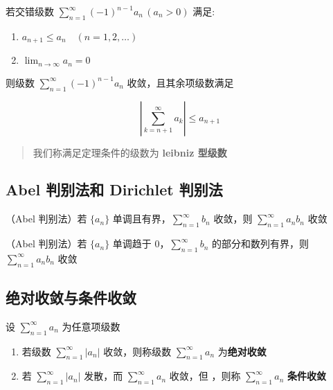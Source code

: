 \documentclass[lang = zh , final , oneside , openany , titlepage , zihao = -4 , linespread = 1.3 , baselineskip = false , cjk-font = windows , text-font = newtx , math-font = newtx]{sjtureport}
\begin{document}
\begin{definition}
    若交错级数
\(\displaystyle \sum_{n=1}^\infty (-1)^{n-1}a_n \,\left(a_n>0\right)\)
满足:

\begin{enumerate}
\item
  \(a_{n+1} \leq a_n \quad \left(n = 1 ,2 ,\ldots\right)\)
\item
  \(\displaystyle\lim_{n\to\infty}a_n =0\)
\end{enumerate}

则级数 \(\displaystyle \sum_{n=1}^\infty (-1)^{n-1}a_n\)
收敛，且其余项级数满足

\[\left\vert \sum_{k=n+1}^\infty a_k \right\vert \leq a_{n+1}\]

\begin{quote}
我们称满足定理条件的级数为 \textbf{leibniz 型级数}
\end{quote}

\subsection{Abel 判别法和 Dirichlet 判别法}

\begin{theorem}
    （Abel 判别法）若 \(\{a_n\}\) 单调且有界，\(\displaystyle\sum_{n=1}^\infty b_n\)
收敛，则 \(\displaystyle \sum_{n=1}^\infty a_nb_n\) 收敛
\end{theorem}

\begin{theorem}
    （Abel 判别法）若 \(\{a_n\}\) 单调趋于 \(0\)，\(\displaystyle \sum_{n=1}^\infty b_n\)
的部分和数列有界，则 \(\displaystyle \sum_{n=1}^\infty a_nb_n\) 收敛
\end{theorem}

\subsection{绝对收敛与条件收敛}

\begin{definition}
    设 \(\displaystyle \sum_{n=1}^\infty a_n\) 为任意项级数

\begin{enumerate}
\def\labelenumi{\arabic{enumi}.}
\item
  若级数 \(\displaystyle \sum_{n=1}^\infty \vert a_n \vert\)
  收敛，则称级数 \(\displaystyle \sum_{n=1}^\infty a_n\)
  为\textbf{绝对收敛}
\item
  若 \(\displaystyle \sum_{n=1}^\infty \vert a_n \vert\) 发散，而
  \(\displaystyle \sum_{n=1}^\infty a_n\) 收敛，但 ，则称
  \(\displaystyle \sum_{n=1}^\infty a_n\) \textbf{条件收敛}
\end{enumerate}
\end{definition}


\end{definition}
\end{document}

